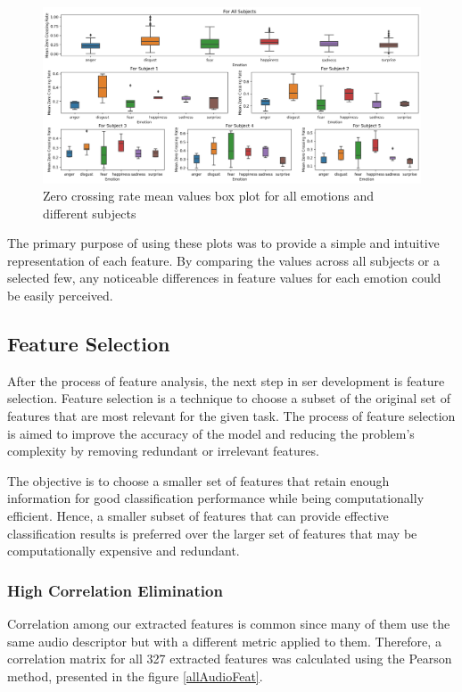 \begin{figure}[H]
	\centering
	\includegraphics[width=\linewidth]{figs/4_1_traditional/mean_zcr_box_plot.png}
	\caption{Zero crossing rate mean values box plot for all emotions and different subjects}
	\label{fig:zcrMeanBoxPlot}
\end{figure}

The primary purpose of using these plots was to provide a simple and intuitive representation of each feature. By comparing the values across all subjects or a selected few, any noticeable differences in feature values for each emotion could be easily perceived.

\subsection{Feature Selection}

After the process of feature analysis, the next step in \ac{ser} development is feature selection. Feature selection is a technique to choose a subset of the original set of features that are most relevant for the given task. The process of feature selection is aimed to improve the accuracy of the model and reducing the problem's complexity by removing redundant or irrelevant features. 

The objective is to choose a smaller set of features that retain enough information for good classification performance while being computationally efficient. Hence, a smaller subset of features that can provide effective classification results is preferred over the larger set of features that may be computationally expensive and redundant.

\subsubsection{High Correlation Elimination}

Correlation among our extracted features is common since many of them use the same audio descriptor but with a different metric applied to them. Therefore, a correlation matrix for all 327 extracted features was calculated using the Pearson method, presented in the figure \ref{allAudioFeat}.

